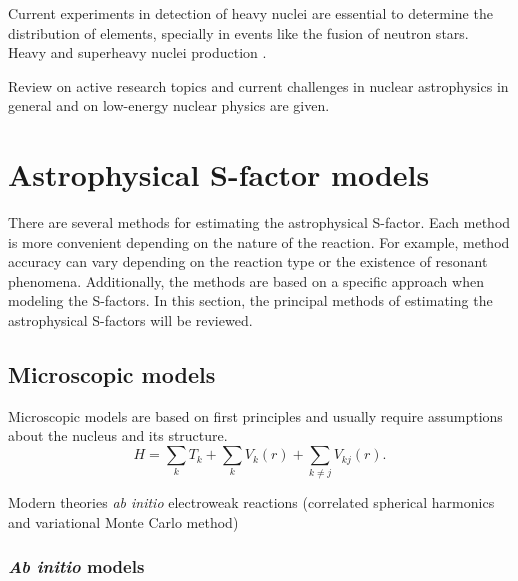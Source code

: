 \documentclass[openany]{book}
\begin{document}
Current experiments in detection of heavy nuclei are essential to determine the distribution of elements, specially in events like the fusion of neutron stars.\\ 

Heavy and superheavy nuclei production \cite{adamian_antonenko_2022}.

Review on active research topics and current challenges in nuclear astrophysics in general \cite{arcones_bardayan_beers_bernstein_blackmon_messer_brown_brown_brune_champagne_et_2017} and on low-energy nuclear physics \cite{carlson_carpenter_casten_elster_fallon_gade_gross_hagen_hayes_higinbotham_et_2017} are given.



\chapter{Astrophysical S-factor models} \label{ch:sfactorModels}

There are several methods for estimating the astrophysical S-factor. Each method is more convenient depending on the nature of the reaction. For example, method accuracy can vary depending on  the reaction type or the existence of resonant phenomena. Additionally, the methods are based on a specific approach when modeling the S-factors. In this section, the principal methods of estimating the astrophysical S-factors will be reviewed.

\section{Microscopic models} \label{sec:microscopicalModels}

Microscopic models are based on first principles and usually require assumptions about the nucleus and its structure. \\ 

\begin{equation} \label{eq:micro_hamiltonian}
	H = \sum_{k} T_k + \sum_{k} V_k (r) + \sum_{k \neq j} V_{kj}(r).
\end{equation}

Modern theories \textit{ab initio} electroweak reactions  (correlated spherical harmonics and variational Monte Carlo method) \cite{marcucci_nollett_schiavilla_wiringa_2006}

\subsection{\textit{Ab initio} models} \label{sub:microscopical_abinitio}
\end{document}
